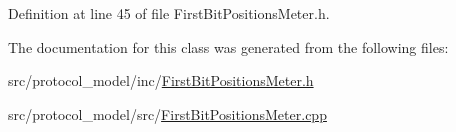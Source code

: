 Definition at line 45 of file First\-Bit\-Positions\-Meter.\-h.



The documentation for this class was generated from the following files\-:\begin{DoxyCompactItemize}
\item 
src/protocol\-\_\-model/inc/\hyperlink{_first_bit_positions_meter_8h}{First\-Bit\-Positions\-Meter.\-h}\item 
src/protocol\-\_\-model/src/\hyperlink{_first_bit_positions_meter_8cpp}{First\-Bit\-Positions\-Meter.\-cpp}\end{DoxyCompactItemize}
